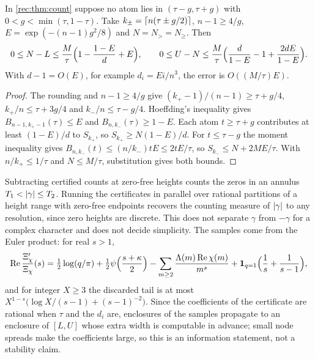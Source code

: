 \begin{proposition}\label{rec:prop:countrate}
In \cref{rec:thm:count} suppose no atom lies in $(\tau-g,\tau+g)$ with $0<g<\min(\tau,1-\tau)$.
Take $k_\pm=\ceil{n(\tau\pm g/2)}$, $n-1\ge4/g$, $E=\exp(-(n-1)g^2/8)$ and $N=N_>=N_\ge$. Then
\[
 0\le N-L\le\frac M\tau\Bigl(1-\frac{1-E}d+E\Bigr),\qquad
 0\le U-N\le\frac M\tau\Bigl(\frac d{1-E}-1+\frac{2dE}{1-E}\Bigr).
\]
With $d-1=O(E)$, for example $d_i=Ei/n^3$, the error is $O((M/\tau)E)$.
\end{proposition}

\begin{proof}
The rounding and $n-1\ge4/g$ give $(k_+-1)/(n-1)\ge\tau+g/4$, $k_+/n\le\tau+3g/4$ and
$k_-/n\le\tau-g/4$. Hoeffding's inequality \cite{Hoeffding1963Probability} gives
$B_{n-1,k_+-1}(\tau)\le E$ and $B_{n,k_-}(\tau)\ge1-E$. Each atom $t\ge\tau+g$ contributes at least
$(1-E)/d$ to $S_{k_+}$, so $S_{k_+}\ge N(1-E)/d$. For $t\le\tau-g$ the moment inequality gives
$B_{n,k_-}(t)\le(n/k_-)tE\le2tE/\tau$, so $S_{k_-}\le N+2ME/\tau$. With $n/k_+\le1/\tau$ and
$N\le M/\tau$, substitution gives both bounds.
\end{proof}

Subtracting certified counts at zero-free heights counts the zeros in an annulus
$T_1<\abs\gamma\le T_2$. Running the certificates in parallel over rational partitions of a
height range with zero-free endpoints recovers the counting measure of $\abs\gamma$ to any
resolution, since zero heights are discrete. This does not separate $\gamma$ from $-\gamma$ for
a complex character and does not decide simplicity. The samples come from the Euler product:
for real $s>1$,
\[
 \Re\frac{\Xi_\chi'}{\Xi_\chi}(s)=\tfrac12\log(q/\pi)+\tfrac12\psi\Bigl(\frac{s+\kappa}2\Bigr)
 -\sum_{m\ge2}\frac{\Lambda(m)\Re\chi(m)}{m^s}+\mathbf 1_{q=1}\Bigl(\frac1s+\frac1{s-1}\Bigr),
\]
and for integer $X\ge3$ the discarded tail is at most
$X^{1-s}\bigl(\log X/(s-1)+(s-1)^{-2}\bigr)$. Since the coefficients of the certificate are rational
when $\tau$ and the $d_i$ are, enclosures of the samples propagate to an enclosure of $[L,U]$
whose extra width is computable in advance; small node spreads make the coefficients large, so
this is an information statement, not a stability claim.

